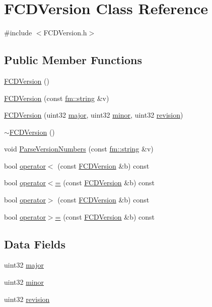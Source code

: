\hypertarget{classFCDVersion}{
\section{FCDVersion Class Reference}
\label{classFCDVersion}
}


{\ttfamily \#include $<$FCDVersion.h$>$}

\subsection*{Public Member Functions}
\begin{DoxyCompactItemize}
\item 
\hyperlink{classFCDVersion_aabd470c6d19ddb7ff287ab601d344a21}{FCDVersion} ()
\item 
\hyperlink{classFCDVersion_a59ac2d2b345da3aa81fd5353a321792a}{FCDVersion} (const \hyperlink{classfm_1_1stringT}{fm::string} \&v)
\item 
\hyperlink{classFCDVersion_af12b625017f133c10a0dba3c780340e5}{FCDVersion} (uint32 \hyperlink{classFCDVersion_ad2508c7e5740ba8f03a0afe18bb9c7b5}{major}, uint32 \hyperlink{classFCDVersion_a7fa0db1f60be770ccff8ff93c3e11deb}{minor}, uint32 \hyperlink{classFCDVersion_a24a8596d2fa8ebfbb5866abb7be4801c}{revision})
\item 
\hyperlink{classFCDVersion_acb581433e7ac673c5b53d2a52afa4471}{$\sim$FCDVersion} ()
\item 
void \hyperlink{classFCDVersion_ad5677d5ab3fc13182e1385b209856cf9}{ParseVersionNumbers} (const \hyperlink{classfm_1_1stringT}{fm::string} \&v)
\item 
bool \hyperlink{classFCDVersion_a2ecd2a362323743defbf4134010c0df6}{operator$<$} (const \hyperlink{classFCDVersion}{FCDVersion} \&b) const 
\item 
bool \hyperlink{classFCDVersion_aa38153b38b9512d1101a6b3557d56f7d}{operator$<$=} (const \hyperlink{classFCDVersion}{FCDVersion} \&b) const 
\item 
bool \hyperlink{classFCDVersion_a9f1a163cee576efb2cf2e18659368fdf}{operator$>$} (const \hyperlink{classFCDVersion}{FCDVersion} \&b) const 
\item 
bool \hyperlink{classFCDVersion_a9ff11e9ff8690123f22b87d3de2591d4}{operator$>$=} (const \hyperlink{classFCDVersion}{FCDVersion} \&b) const 
\end{DoxyCompactItemize}
\subsection*{Data Fields}
\begin{DoxyCompactItemize}
\item 
uint32 \hyperlink{classFCDVersion_ad2508c7e5740ba8f03a0afe18bb9c7b5}{major}
\item 
uint32 \hyperlink{classFCDVersion_a7fa0db1f60be770ccff8ff93c3e11deb}{minor}
\item 
uint32 \hyperlink{classFCDVersion_a24a8596d2fa8ebfbb5866abb7be4801c}{revision}
\end{DoxyCompactItemize}
